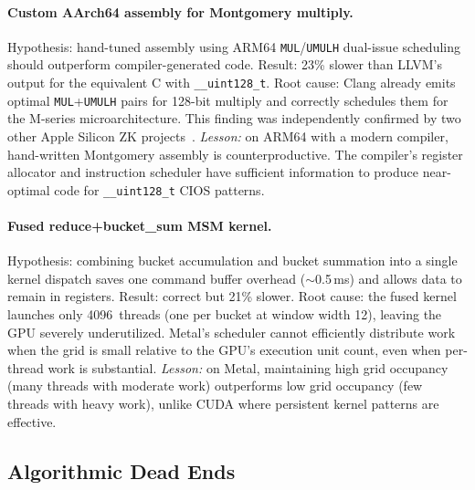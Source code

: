 \paragraph{Custom AArch64 assembly for Montgomery multiply.}
Hypothesis: hand-tuned assembly using ARM64 \texttt{MUL}/\texttt{UMULH} dual-issue scheduling should outperform compiler-generated code.
Result: 23\% slower than LLVM's output for the equivalent C with \texttt{\_\_uint128\_t}.
Root cause: Clang already emits optimal \texttt{MUL}+\texttt{UMULH} pairs for 128-bit multiply and correctly schedules them for the M-series microarchitecture.
This finding was independently confirmed by two other Apple Silicon ZK projects~\cite{lightningjolt, aztecfasttech}.
\emph{Lesson:} on ARM64 with a modern compiler, hand-written Montgomery assembly is counterproductive.
The compiler's register allocator and instruction scheduler have sufficient information to produce near-optimal code for \texttt{\_\_uint128\_t} CIOS patterns.

\paragraph{Fused reduce+bucket\_sum MSM kernel.}
Hypothesis: combining bucket accumulation and bucket summation into a single kernel dispatch saves one command buffer overhead ($\sim$0.5\,ms) and allows data to remain in registers.
Result: correct but 21\% slower.
Root cause: the fused kernel launches only 4096~threads (one per bucket at window width 12), leaving the GPU severely underutilized.
Metal's scheduler cannot efficiently distribute work when the grid is small relative to the GPU's execution unit count, even when per-thread work is substantial.
\emph{Lesson:} on Metal, maintaining high grid occupancy (many threads with moderate work) outperforms low grid occupancy (few threads with heavy work), unlike CUDA where persistent kernel patterns are effective.

\subsection{Algorithmic Dead Ends}
\label{sec:dead-algo}

